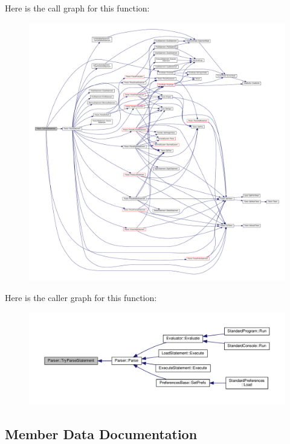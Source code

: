 Here is the call graph for this function\+:\nopagebreak
\begin{figure}[H]
\begin{center}
\leavevmode
\includegraphics[width=350pt]{classParser_aeef41071b484e09942290ab55953dc4f_cgraph}
\end{center}
\end{figure}




Here is the caller graph for this function\+:\nopagebreak
\begin{figure}[H]
\begin{center}
\leavevmode
\includegraphics[width=350pt]{classParser_aeef41071b484e09942290ab55953dc4f_icgraph}
\end{center}
\end{figure}




\subsection{Member Data Documentation}
